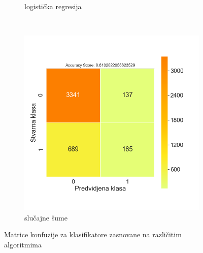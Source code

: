 \documentclass[12pt,oneside]{memoir}
\begin{document}
\begin{figure}[!ht]
\begin{subfigure}[b]{0.45\textwidth}
        \caption{logistička regresija}
        \label{fig:logreg}
    \end{subfigure}
    \\
    \begin{subfigure}[b]{0.45\textwidth}
        \centering
        \includegraphics[width=\textwidth]{RF_basic_data_confussion_matrix}
        \caption{slučajne šume}
        \label{fig:randfor}
    \end{subfigure}
    \caption{Matrice konfuzije za klasifikatore zasnovane na različitim algoritmima}
    \label{fig:confmatr}
\end{figure}

\end{document}
